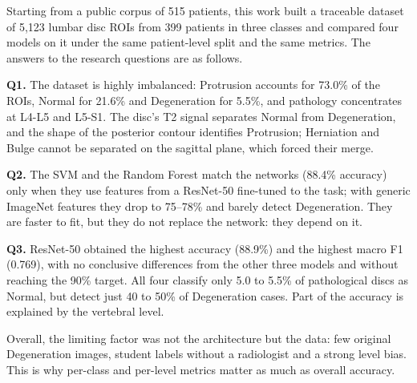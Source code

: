 Starting from a public corpus of 515 patients, this work built a traceable dataset of 5,123 lumbar disc ROIs from 399 patients in three classes and compared four models on it under the same patient-level split and the same metrics. The answers to the research questions are as follows.

\textbf{Q1.} The dataset is highly imbalanced: Protrusion accounts for 73.0\% of the ROIs, Normal for 21.6\% and Degeneration for 5.5\%, and pathology concentrates at L4-L5 and L5-S1. The disc's T2 signal separates Normal from Degeneration, and the shape of the posterior contour identifies Protrusion; Herniation and Bulge cannot be separated on the sagittal plane, which forced their merge.

\textbf{Q2.} The SVM and the Random Forest match the networks (88.4\% accuracy) only when they use features from a ResNet-50 fine-tuned to the task; with generic ImageNet features they drop to 75--78\% and barely detect Degeneration. They are faster to fit, but they do not replace the network: they depend on it.

\textbf{Q3.} ResNet-50 obtained the highest accuracy (88.9\%) and the highest macro F1 (0.769), with no conclusive differences from the other three models and without reaching the 90\% target. All four classify only 5.0 to 5.5\% of pathological discs as Normal, but detect just 40 to 50\% of Degeneration cases. Part of the accuracy is explained by the vertebral level.

Overall, the limiting factor was not the architecture but the data: few original Degeneration images, student labels without a radiologist and a strong level bias. This is why per-class and per-level metrics matter as much as overall accuracy.
